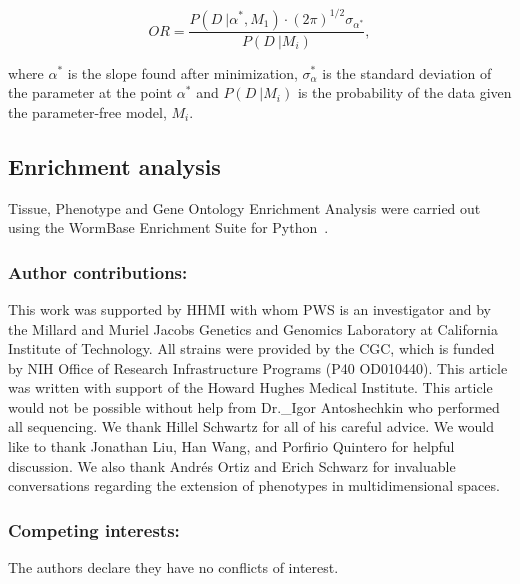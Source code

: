 \documentclass[10pt, onecolumn]{article}
\begin{document}
\begin{equation}
  OR = \frac{
  P(D~|\alpha^*, M_1)\cdot {(2\pi)}^{1/2}\sigma_{\alpha^*} %
  }{P(D~| M_i)}, %
\end{equation}

where $\alpha^*$ is the slope found after minimization, $\sigma_\alpha^*$ is the
standard deviation of the parameter at the point $\alpha^*$ and $P(D~|M_i)$ is the
probability of the data given the parameter-free model, $M_i$.

\subsection*{Enrichment analysis}
Tissue, Phenotype and Gene Ontology Enrichment Analysis were carried out using
the WormBase Enrichment Suite for Python~\cite{Angeles-Albores2016b,
Angeles-Albores2016}.



\subsubsection*{Author contributions:}
This work was supported by HHMI with whom PWS is an investigator
and by the Millard and Muriel Jacobs Genetics and Genomics Laboratory at
California Institute of Technology.
All strains were provided by the CGC, which is funded by NIH Office of Research
Infrastructure Programs (P40 OD010440).
This article was written with support of the Howard Hughes Medical Institute.
This article would not be possible without help from Dr.\_Igor Antoshechkin who
performed all sequencing.
We thank Hillel Schwartz for all of his careful advice.
We would like to thank Jonathan Liu, Han Wang, and Porfirio Quintero for helpful
discussion. We also thank Andrés Ortiz and Erich Schwarz for invaluable
conversations regarding the extension of phenotypes in multidimensional spaces.


\subsubsection*{Competing interests:}
The authors declare they have no conflicts of interest.






\end{document}

